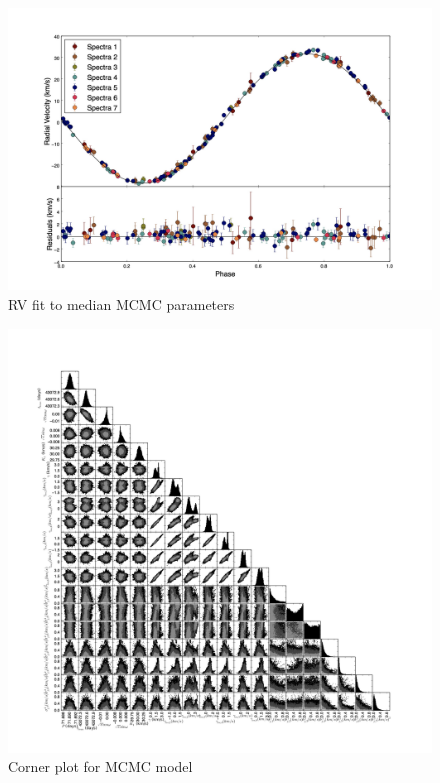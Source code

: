 \documentclass{article}
\begin{document}
\begin{figure}[!htb]
\centering
\includegraphics[width=\textwidth]{RVfit_10000.jpg}
\caption{RV fit to median MCMC parameters}
\end{figure}

\begin{figure}[!htb]
\centering
\includegraphics[width=\textwidth]{corner_10000.jpg}
\caption{Corner plot for MCMC model}
\end{figure}
\end{document}
